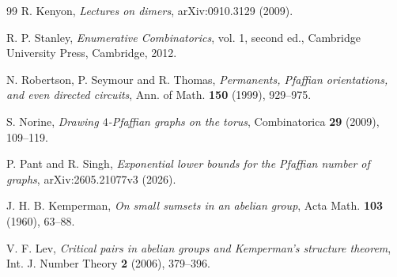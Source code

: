 \documentclass[11pt,reqno]{amsart}
\theoremstyle{remark}
\numberwithin{equation}{section}
\begin{document}
\begin{thebibliography}{99}
 R. Kenyon,
\emph{Lectures on dimers}, arXiv:0910.3129 (2009).

 R. P. Stanley,
\emph{Enumerative Combinatorics}, vol. 1, second ed.,
Cambridge University Press, Cambridge, 2012.

 N. Robertson, P. Seymour and R. Thomas,
\emph{Permanents, Pfaffian orientations, and even directed circuits},
Ann. of Math. \textbf{150} (1999), 929--975.

 S. Norine,
\emph{Drawing \(4\)-Pfaffian graphs on the torus},
Combinatorica \textbf{29} (2009), 109--119.

 P. Pant and R. Singh,
\emph{Exponential lower bounds for the Pfaffian number of graphs},
arXiv:2605.21077v3 (2026).

 J. H. B. Kemperman,
\emph{On small sumsets in an abelian group},
Acta Math. \textbf{103} (1960), 63--88.

 V. F. Lev,
\emph{Critical pairs in abelian groups and Kemperman's structure theorem},
Int. J. Number Theory \textbf{2} (2006), 379--396.
\end{thebibliography}
\end{document}
